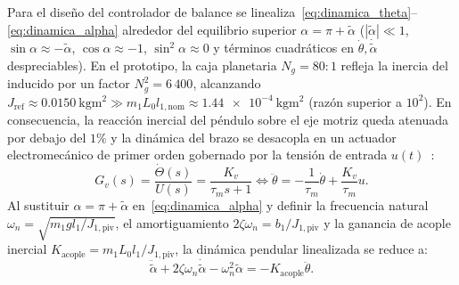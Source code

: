 Para el diseño del controlador de balance se linealiza~\eqref{eq:dinamica_theta}--\eqref{eq:dinamica_alpha} alrededor del equilibrio superior $\alpha = \pi + \tilde{\alpha}$ ($|\tilde{\alpha}|\ll 1$, $\sin\alpha\approx -\tilde{\alpha}$, $\cos\alpha\approx -1$, $\sin^2\alpha\approx 0$ y términos cuadráticos en $\dot{\theta},\dot{\tilde{\alpha}}$ despreciables). En el prototipo, la caja planetaria $N_g = 80:1$ refleja la inercia del inducido por un factor $N_g^2 = 6\,400$, alcanzando $J_{\text{ref}} \approx \qty{0.0150}{\kilo\gram\square\meter} \gg m_1 L_0 l_{1,\text{nom}} \approx \qty{1.44e-4}{\kilo\gram\square\meter}$ (razón superior a $10^2$). En consecuencia, la reacción inercial del péndulo sobre el eje motriz queda atenuada por debajo del $1\%$ y la dinámica del brazo se desacopla en un actuador electromecánico de primer orden gobernado por la tensión de entrada $u(t)$~\cite{Ogata2010}:
\begin{equation}
    G_v(s) = \frac{\dot{\Theta}(s)}{U(s)} = \frac{K_v}{\tau_m s + 1} \iff \ddot{\theta} = -\frac{1}{\tau_m}\dot{\theta} + \frac{K_v}{\tau_m}u.
    \label{eq:gv_actuador}
\end{equation}
Al sustituir $\alpha = \pi + \tilde{\alpha}$ en~\eqref{eq:dinamica_alpha} y definir la frecuencia natural $\omega_n = \sqrt{m_1 g l_1 / J_{1,\text{piv}}}$, el amortiguamiento $2\zeta\omega_n = b_1 / J_{1,\text{piv}}$ y la ganancia de acople inercial $K_{\text{acople}} = m_1 L_0 l_1 / J_{1,\text{piv}}$, la dinámica pendular linealizada se reduce a:
\begin{equation}
    \ddot{\tilde{\alpha}} + 2\zeta\omega_n\dot{\tilde{\alpha}} - \omega_n^2\tilde{\alpha} = -K_{\text{acople}}\ddot{\theta}.
    \label{eq:pendulo_linealizado}
\end{equation}


